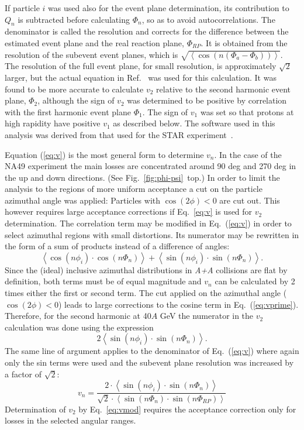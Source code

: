 \documentclass[aps,prc,superscriptaddress,showpacs,floatfix,nofootinbib]{revtex4}
\newcommand{\mean}[1]{\left\langle #1 \right\rangle}
\begin{document}
If particle $i$ was used also for the event plane determination, its
contribution to $Q_n$ is subtracted before calculating $\Phi_n$, so as
to avoid autocorrelations. The denominator is called the resolution
and corrects for the difference between the estimated event plane and
the real reaction plane, $\Phi_{RP}$. It is obtained from the
resolution of the subevent event planes, which is
$\sqrt{\mean{\cos(n(\Phi_a - \Phi_b))}}$. The resolution of the full
event plane, for small resolution, is approximately $\sqrt{2}$ larger,
but the actual equation in Ref.~\cite{Poskanzer:1998yz} was used for
this calculation. It was found to be more accurate to calculate $v_2$
relative to the second harmonic event plane, $\Phi_2$, although the
sign of $v_2$ was determined to be positive by correlation with the
first harmonic event plane $\Phi_1$. The sign of $v_1$ was set so that
protons at high rapidity have positive $v_1$ as described below. The
software used in this analysis was derived from that used for the
STAR experiment~\cite{Ackermann:2000tr}.

Equation (\ref{eq:v}) is the most general form to determine $v_n$. In
the case of the NA49 experiment the main losses are concentrated
around 90 deg and 270 deg in the up and down directions. (See
Fig.~\ref{fig:phi-psi}~top.) In order to limit the analysis to the
regions of more uniform acceptance a cut on the particle azimuthal
angle was applied: Particles with $\cos(2\phi) < 0$ are cut out.  This
however requires large acceptance corrections if Eq.~\ref{eq:v} is
used for $v_2$ determination.  The correlation term may be modified in
Eq.~(\ref{eq:v}) in order to select azimuthal regions with small
distortions. Its numerator may be rewritten in the form of a sum of
products instead of a difference of angles:
\begin{equation}
\label{eq:vprime}
  \mean{\cos(n\phi_i) \cdot \cos(n\Phi_n)} 
+ \mean{\sin(n\phi_i) \cdot \sin(n\Phi_n)}. 
\end{equation}
Since the (ideal) inclusive azimuthal distributions in {\it A+A}
collisions are flat by definition, both terms must be of equal
magnitude and $v_n$ can be calculated by 2 times either the first or
second term.  The cut applied on the azimuthal angle ($\cos(2\phi) <
0$) leads to large corrections to the cosine term in
Eq.~(\ref{eq:vprime}).  Therefore, for the second harmonic at 40$A$
GeV the numerator in the $v_2$ calculation was done using the
expression
\begin{equation}
\label{eq:vprimeprime}
  2\mean{\sin(n\phi_i) \cdot \sin(n\Phi_n)}.
\end{equation} 
The same line of argument applies to the denominator of
Eq.~(\ref{eq:v}) where again only the sin terms were used and the
subevent plane resolution was increased by a factor of $\sqrt{2}$:
\begin{equation}
\label{eq:vmod}
v_n = \frac{2 \cdot \mean{\sin(n\phi_i) \cdot \sin(n\Phi_n)}}
        {\sqrt{2} \cdot \mean{\sin(n\Phi_n) \cdot \sin(n\Phi_{RP})}} 
\end{equation}
Determination of $v_2$ by Eq.~\ref{eq:vmod} requires the acceptance
correction only for losses in the selected angular ranges.
\end{document}
